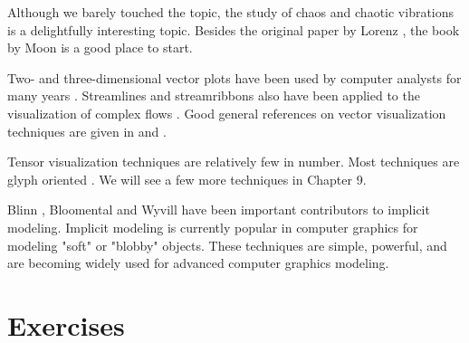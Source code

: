 	Although we barely touched the topic, the study of chaos and chaotic vibrations is a delightfully interesting topic. Besides the original paper by Lorenz \cite{Lorenz63}, the book by Moon \cite{Moon87} is a good place to start.
	
	Two- and three-dimensional vector plots have been used by computer analysts for many years \cite{Fuller80}. Streamlines and streamribbons also have been applied to the visualization of complex flows \cite{Volpe89}. Good general references on vector visualization techniques are given in \cite{Helman90} and \cite{Richter90}.
	
	Tensor visualization techniques are relatively few in number. Most techniques are glyph oriented \cite{Haber90} \cite{deLeeuw93}. We will see a few more techniques in Chapter 9.
	
	Blinn \cite{Blinn82}, Bloomental \cite{Bloomenthal88} \cite{Bloomenthal97} and Wyvill \cite{Wyvill86} have been important contributors to implicit modeling. Implicit modeling is currently popular in computer graphics for modeling "soft" or "blobby" objects. These techniques are simple, powerful, and are becoming widely used for advanced computer graphics modeling.
	
	
	\printbibliography
	
	
	\section{Exercises}
	